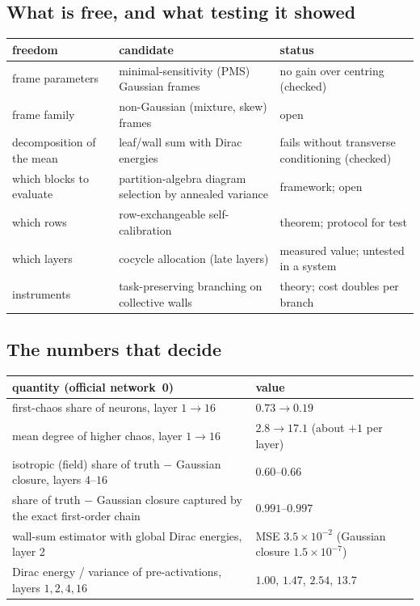 \subsection{What is free, and what testing it showed}
\begin{center}\small
\begin{tabular}{>{\raggedright\arraybackslash}p{4.6cm}>{\raggedright\arraybackslash}p{5.0cm}>{\raggedright\arraybackslash}p{4.4cm}}\toprule
freedom & candidate & status\\\midrule
frame parameters & minimal-sensitivity (PMS) Gaussian frames & no gain over centring (checked)\\
frame family & non-Gaussian (mixture, skew) frames & open\\
decomposition of the mean & leaf/wall sum with Dirac energies & fails without transverse conditioning (checked)\\
which blocks to evaluate & partition-algebra diagram selection by annealed variance & framework; open\\
which rows & row-exchangeable self-calibration & theorem; protocol for test\\
which layers & cocycle allocation (late layers) & measured value; untested in a system\\
instruments & task-preserving branching on collective walls & theory; cost doubles per branch\\\bottomrule
\end{tabular}
\end{center}

\subsection{The numbers that decide}
\begin{center}\small
\begin{tabular}{>{\raggedright\arraybackslash}p{8.4cm}>{\raggedright\arraybackslash}p{5.2cm}}\toprule
quantity (official network~0) & value\\\midrule
first-chaos share of neurons, layer $1\to16$ & $0.73\to0.19$\\
mean degree of higher chaos, layer $1\to16$ & $2.8\to17.1$ (about $+1$ per layer)\\
isotropic (field) share of truth $-$ Gaussian closure, layers $4$--$16$ & $0.60$--$0.66$\\
share of truth $-$ Gaussian closure captured by the exact first-order chain & $0.991$--$0.997$\\
wall-sum estimator with global Dirac energies, layer 2 & MSE $3.5\times10^{-2}$ (Gaussian closure $1.5\times10^{-7}$)\\
Dirac energy / variance of pre-activations, layers $1,2,4,16$ & $1.00$, $1.47$, $2.54$, $13.7$\\\bottomrule
\end{tabular}
\end{center}
